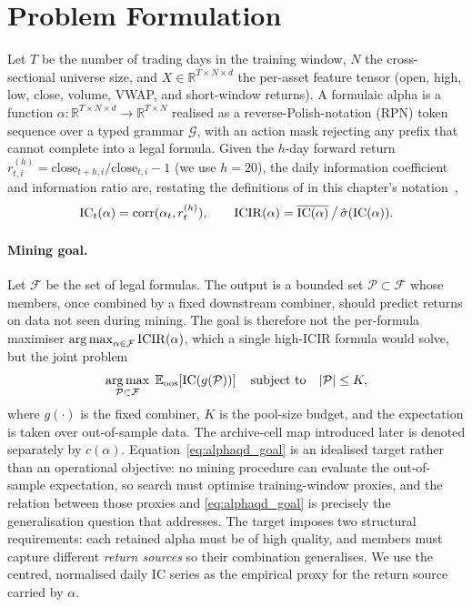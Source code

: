 \section{Problem Formulation}
\label{sec:alphaqd_formulation}

Let $T$ be the number of trading days in the training window, $N$ the cross-sectional universe size, and $X\in\mathbb{R}^{T\times N\times d}$ the per-asset feature tensor (open, high, low, close, volume, VWAP, and short-window returns). A formulaic alpha is a function $\alpha:\mathbb{R}^{T\times N\times d}\to\mathbb{R}^{T\times N}$ realised as a reverse-Polish-notation (RPN) token sequence over a typed grammar $\mathcal{G}$, with an action mask rejecting any prefix that cannot complete into a legal formula. Given the $h$-day forward return $r^{(h)}_{t,i}=\mathrm{close}_{t+h,i}/\mathrm{close}_{t,i}-1$ (we use $h=20$), the daily information coefficient and information ratio are, restating the definitions of  in this chapter's notation~\cite{grinold2000active},
\begin{equation}
\label{eq:alphaqd_ic}
\mathrm{IC}_t(\alpha) = \operatorname{corr}(\alpha_t, r^{(h)}_t),
\qquad
\mathrm{ICIR}(\alpha) = \overline{\mathrm{IC}(\alpha)}\,\big/\,\hat\sigma(\mathrm{IC}(\alpha)).
\end{equation}

\paragraph{Mining goal.} Let $\mathcal{F}$ be the set of legal formulas. The output is a bounded set $\mathcal{P}\subset\mathcal{F}$ whose members, once combined by a fixed downstream combiner, should predict returns on data not seen during mining. The goal is therefore not the per-formula maximiser $\operatorname*{arg\,max}_{\alpha\in\mathcal{F}}\mathrm{ICIR}(\alpha)$, which a single high-ICIR formula would solve, but the joint problem
\begin{equation}
\label{eq:alphaqd_goal}
\operatorname*{arg\,max}_{\mathcal{P}\subset\mathcal{F}}\;\mathbb{E}_{\mathrm{oos}}\!\left[\mathrm{IC}(g(\mathcal{P}))\right]
\quad\text{subject to}\quad |\mathcal{P}|\le K,
\end{equation}
where $g(\cdot)$ is the fixed combiner, $K$ is the pool-size budget, and the expectation is taken over out-of-sample data. The archive-cell map introduced later is denoted separately by $c(\alpha)$. Equation~\eqref{eq:alphaqd_goal} is an idealised target rather than an operational objective: no mining procedure can evaluate the out-of-sample expectation, so search must optimise training-window proxies, and the relation between those proxies and \eqref{eq:alphaqd_goal} is precisely the generalisation question that  addresses. The target imposes two structural requirements: each retained alpha must be of high quality, and members must capture different \emph{return sources} so their combination generalises. We use the centred, normalised daily IC series as the empirical proxy for the return source carried by $\alpha$.

